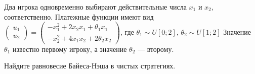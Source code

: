 \begin{problem}

Два игрока одновременно выбирают действительные числа  $x_{1} $  и  $x_{2} $, соответственно.
Платежные функции имеют вид\\
 $\left(\begin{array}{l} {u_{1} } \\ {u_{2} } \end{array}\right)=\left(\begin{array}{l} {-x_{1}^{2} +2x_{2} x_{1} +\theta _{1} x_{1} } \\ {-x_{2}^{2} +4x_{1} x_{2} +2\theta _{2} x_{2} } \end{array}\right)$, где  $\theta _{1} \sim U\left[0;2\right]$,  $\theta _{2} \sim U\left[1;2\right]$
Значение  $\theta _{1} $  известно первому игроку, а значение  $\theta _{2} $  — второму.

Найдите равновесие Байеса-Нэша в чистых стратегиях.

\begin{sol}

\end{sol}
\end{problem}



